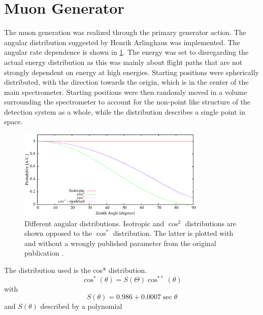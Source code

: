   
  \section{Muon Generator}
  \label{ch:Simulation software:sec:Muon generator}
  
  The muon generation was realized through the primary generator action. The angular distribution suggested by Henrik Arlinghaus \cite{DTArlinghaus} was implemented. The angular rate dependence is shown in \ref{fig:rateDependance}. The energy was set to  disregarding the actual energy distribution as this was mainly about flight paths that are not strongly dependent on energy at high energies. Starting positions were spherically distributed, with the direction towards the origin, which is in the center of the main spectrometer. Starting positions were then randomly moved in a volume surrounding the spectrometer to account for the non-point like structure of the detection system as a whole, while the distribution describes a single point in space.
  \begin{figure}
  \centering
  \includegraphics[width = 0.8\textwidth]{graphics/simulation/angularDistributions.eps}
  	\caption[Muon rate dependance on zenith angle]{Different angular distributions. Isotropic and $\cos^2$ distributions are shown opposed to the $\cos^*$ distribution. The latter is plotted with and without a wrongly published parameter from the original publication \cite{distro}.}
  	\label{fig:rateDependance}
  \end{figure}
  The distribution used is the cos* distribution.
  \begin{equation}
  	\cos^*{\left(\theta \right)} = S(\Theta)\cos^{**}{\left(\theta\right)}
  \end{equation}
  with
  \begin{equation}
  	S(\theta) = 0.986 + 0.0007\sec{\theta}
  \end{equation}
  and $S(\theta)$ described by a polynomial
